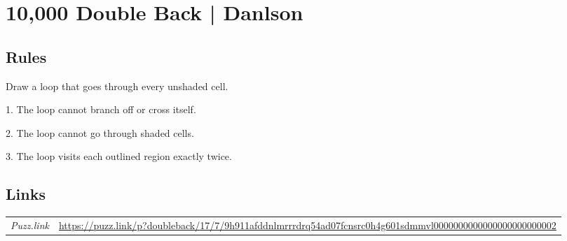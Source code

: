 \section[10,000 Double Back | Danlson {[\emph{Double Back}]}]{10,000 Double Back | {\normalfont Danlson}}
\label{sec:20-10000-double-back-danlson}

\subsection*{Rules}
\begin{markdown}
Draw a loop that goes through every unshaded cell.

1. The loop cannot branch off or cross itself.

2. The loop cannot go through shaded cells.

3. The loop visits each outlined region exactly twice.
\end{markdown}
\subsection*{Links}
\begin{tabularx}{\textwidth}{l X}
\emph{Puzz.link} & \url{https://puzz.link/p?doubleback/17/7/9h911afddnlmrrrdrq54ad07fcnsrc0h4g601sdmmvl0000000000000000000000002} \\
\end{tabularx}
\pagebreak
